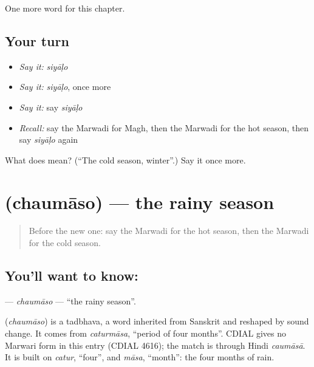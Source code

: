 \begin{grammarlens}[title={What you've built}]
One more word for this chapter.
\end{grammarlens}

\subsection*{Your turn}
\begin{itemize}
\raggedright
  \item \emph{Say it:} \emph{siyāḷo}
  \item \emph{Say it:} \emph{siyāḷo}, once more
  \item \emph{Say it:} say \emph{siyāḷo}
  \item \emph{Recall:} say the Marwadi for Magh, then the Marwadi for the hot season, then say \emph{siyāḷo} again
\end{itemize}

\begin{tcolorbox}[breakable,colback=teal!4,colframe=teal!35!black,title={Before you move on}]
What does  mean? (\textquotedblleft{}The cold season, winter\textquotedblright{}.) Say it once more.
\end{tcolorbox}
\section[\texorpdfstring{\mw{चौमासो} (chaumāso)}{चौमासो (chaumāso)}]{ (chaumāso) — the rainy season}

\label{lesson:MW-C94-chaumaso}



\begin{quote}
Before the new one: say the Marwadi for the hot season, then the Marwadi for the cold season.
\end{quote}

\subsection*{You'll want to know: }
\textbf{} — \emph{chaumāso} — \textquotedblleft{}the rainy season\textquotedblright{}.

\begin{cousinweb}
\textbf{} (\emph{chaumāso}) is a tadbhava, a word inherited from Sanskrit and reshaped by sound change. It comes from \emph{caturmāsa}, \textquotedblleft{}period of four months\textquotedblright{}. CDIAL gives no Marwari form in this entry (CDIAL 4616); the match is through Hindi \emph{caumāsā}. It is built on \emph{catur}, \textquotedblleft{}four\textquotedblright{}, and \emph{māsa}, \textquotedblleft{}month\textquotedblright{}: the four months of rain.
\end{cousinweb}

